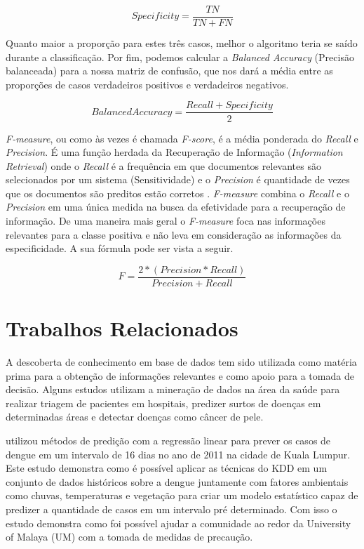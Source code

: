\begin{equation}
Specificity  = \frac{TN}{TN + FN}
\end{equation}

Quanto maior a proporção para estes três casos, melhor o algoritmo teria se saído durante a classificação. Por fim, podemos calcular a \textit{Balanced Accuracy} (Precisão balanceada) para a nossa matriz de confusão, que nos dará a média entre as proporções de casos verdadeiros positivos e verdadeiros negativos.

\begin{equation}
Balanced Accuracy  = \frac{Recall + Specificity}{2}
\end{equation}

\textit{F-measure}, ou como às vezes é chamada \textit{F-score}, é a média ponderada do \textit{Recall} e \textit{Precision}. É uma função herdada da Recuperação de Informação (\textit{Information Retrieval}) onde o \textit{Recall} é a frequência em que documentos relevantes são selecionados por um sistema (Sensitividade) e o \textit{Precision} é quantidade de vezes que os documentos são preditos estão corretos \cite{Powers2014}. \textit{F-measure} combina o \textit{Recall} e o \textit{Precision} em uma única medida na busca da efetividade para a recuperação de informação. De uma maneira mais geral o \textit{F-measure} foca nas informações relevantes para a classe positiva e não leva em consideração as informações da especificidade. A sua fórmula pode ser vista a seguir.

\begin{equation}
F  = \frac{2 * (Precision * Recall)}{Precision + Recall}
\end{equation}


\section{Trabalhos Relacionados}

A descoberta de conhecimento em base de dados tem sido utilizada como matéria prima para a obtenção de informações relevantes e como apoio para a tomada de decisão. Alguns estudos utilizam a mineração de dados na área da saúde para realizar triagem de pacientes em hospitais, predizer surtos de doenças em determinadas áreas e detectar doenças como câncer de pele.

 utilizou métodos de predição com a regressão linear para prever os casos de dengue em um intervalo de 16 dias no ano de 2011 na cidade de Kuala Lumpur. Este estudo demonstra como é possível aplicar as técnicas do KDD em um conjunto de dados históricos sobre a dengue juntamente com fatores ambientais como chuvas, temperaturas e vegetação para criar um modelo estatístico capaz de predizer a quantidade de casos em um intervalo pré determinado. Com isso o estudo demonstra como foi possível ajudar a comunidade ao redor da University of Malaya (UM) com a tomada de medidas de precaução.


